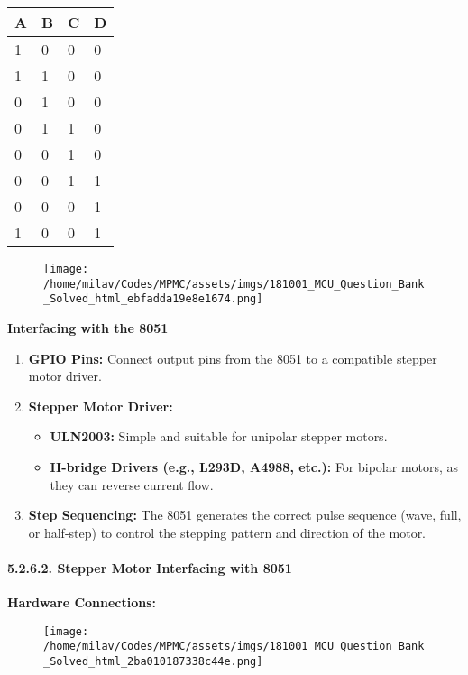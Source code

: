 \documentclass[
]{article}
\begin{document}
\begin{longtable}[]{@{}llll@{}}
\toprule
A & B & C & D \\
\midrule
\endhead
1 & 0 & 0 & 0 \\
1 & 1 & 0 & 0 \\
0 & 1 & 0 & 0 \\
0 & 1 & 1 & 0 \\
0 & 0 & 1 & 0 \\
0 & 0 & 1 & 1 \\
0 & 0 & 0 & 1 \\
1 & 0 & 0 & 1 \\
\bottomrule
\end{longtable}

\begin{figure}
\centering
\texttt{[image: /home/milav/Codes/MPMC/assets/imgs/181001\_MCU\_Question\_Bank\_Solved\_html\_ebfadda19e8e1674.png]}
\caption{}
\end{figure}

\textbf{Interfacing with the 8051}

\begin{enumerate}
\def\labelenumi{\arabic{enumi}.}
\item
  \textbf{GPIO Pins:} Connect output pins from the 8051 to a compatible
  stepper motor driver.
\item
  \textbf{Stepper Motor Driver:}

  \begin{itemize}
  \item
    \textbf{ULN2003:} Simple and suitable for unipolar stepper motors.
  \item
    \textbf{H-bridge Drivers (e.g., L293D, A4988, etc.):} For bipolar
    motors, as they can reverse current flow.
  \end{itemize}
\item
  \textbf{Step Sequencing:} The 8051 generates the correct pulse
  sequence (wave, full, or half-step) to control the stepping pattern
  and direction of the motor.
\end{enumerate}

\hypertarget{5262-stepper-motor-interfacing-with-8051}{%
\paragraph{5.2.6.2. Stepper Motor Interfacing with
8051}\label{5262-stepper-motor-interfacing-with-8051}}

\textbf{Hardware Connections:}

\begin{figure}
\centering
\texttt{[image: /home/milav/Codes/MPMC/assets/imgs/181001\_MCU\_Question\_Bank\_Solved\_html\_2ba010187338c44e.png]}
\caption{}
\end{figure}
\end{document}
